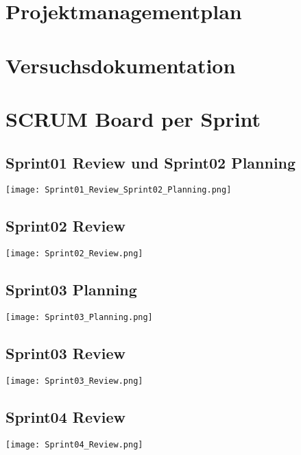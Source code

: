 \chapter{Projektmanagementplan}


\chapter{Versuchsdokumentation}
\label{app:ch:versuche}

\chapter{SCRUM Board per Sprint}

\begin{landscape}
	\section*{Sprint01 Review und Sprint02 Planning}
	\texttt{[image: Sprint01\_Review\_Sprint02\_Planning.png]}
\end{landscape}

\newpage
\section*{Sprint02 Review}
\texttt{[image: Sprint02\_Review.png]}

\newpage
\begin{landscape}
	\section*{Sprint03 Planning}
	\texttt{[image: Sprint03\_Planning.png]}
\end{landscape}

\newpage
\section*{Sprint03 Review}
\texttt{[image: Sprint03\_Review.png]}

\newpage
\begin{landscape}
	\section*{Sprint04 Review}
	\texttt{[image: Sprint04\_Review.png]}
\end{landscape}

